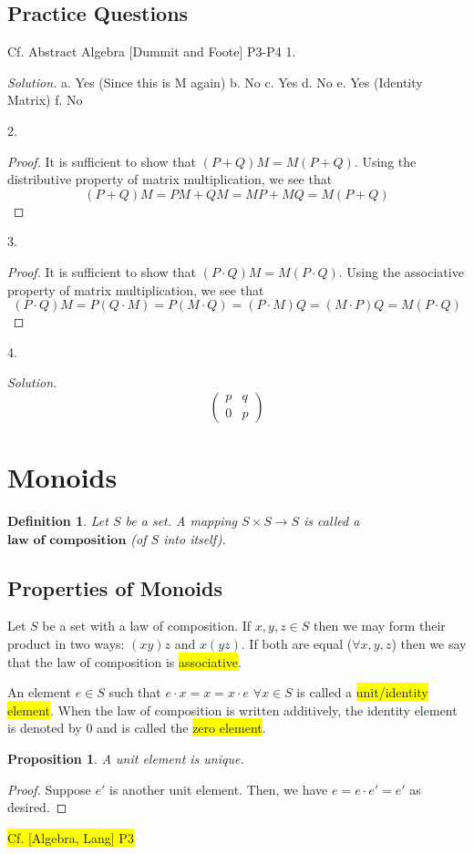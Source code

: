 \documentclass[12pt]{article}
\newcommand{\mybox}[2][black]{\colorbox{#1}{#2}}
\newcommand{\sol}[1]{\begin{mdframed}\emph{Solution.} #1\end{mdframed}}
\newcommand{\solproof}[1]{\begin{mdframed}\begin{proof} #1\end{proof}\end{mdframed}}
\newtheorem{definition}{Definition}
\newtheorem{proposition}{Proposition}
\begin{document}
\subsection{Practice Questions}
Cf. Abstract Algebra [Dummit and Foote] P3-P4 
1. \sol{
a. Yes (Since this is M again)
b. No  
c. Yes 
d. No
e. Yes (Identity Matrix) 
f. No}
2.
\solproof{
It is sufficient to show that $(P+Q)M = M(P+Q)$. Using the distributive property of matrix multiplication, we see that
\[(P+Q)M = PM + QM = MP + MQ = M(P + Q)\]
}
3. \solproof{
It is sufficient to show that $(P \cdot Q)M = M(P \cdot Q)$. Using the associative property of matrix multiplication, we see that
\[(P \cdot Q)M = P (Q \cdot M) = P (M \cdot Q) = (P \cdot M) Q = (M \cdot P) Q = M(P \cdot Q)\]
}
4. \sol{
\[\begin{pmatrix}
p & q \\
0 & p
\end{pmatrix}\]
}






\section{Monoids}
\begin{definition}
   
Let $S$ be a set. A mapping
 $S \times S \rightarrow S$ 
is called a $\textbf{law of composition}$ (of $S$ into itself).



\end{definition}

\subsection{Properties of Monoids}
Let $S$ be a set with a law of composition. If $x,y,z \in S$ then we may form their product in two ways: $(xy)z$ and $x(yz)$. If both are equal ($\forall x,y,z$) then we say that the law of composition is \mybox[yellow]{associative}.

An element $e \in S$ such that $e \cdot x = x = x \cdot e$ $\forall x \in S$ is called a \mybox[yellow]{unit/identity element}. When the law of composition is written additively, the identity element is denoted by $0$ and is called the \mybox[yellow]{zero element}.

\begin{proposition}
A unit element is unique.
\end{proposition}
\begin{proof}
Suppose $e'$ is another unit element. Then, we have $e = e \cdot e' = e'$ as desired.
\end{proof}
\mybox[yellow]{Cf. [Algebra, Lang] P3}
\end{document}
